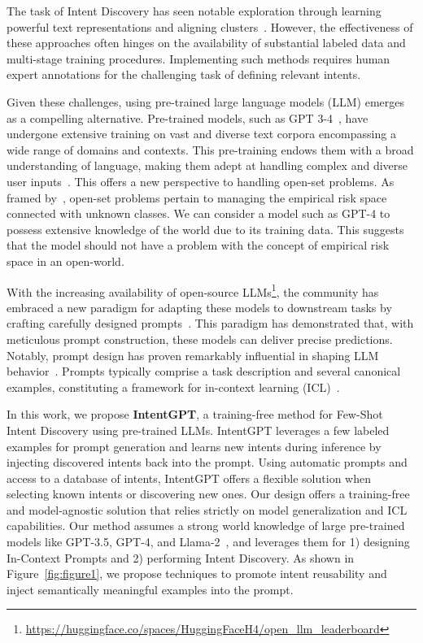 \documentclass[11pt]{article}
\begin{document}
The task of Intent Discovery has seen notable exploration through learning powerful text representations and aligning clusters~\citep{kumar2022intent,zhang2021discovering}. However, the effectiveness of these approaches often hinges on the availability of substantial labeled data and multi-stage training procedures. Implementing such methods requires human expert annotations for the challenging task of defining relevant intents.

Given these challenges, using pre-trained large language models (LLM) emerges as a compelling alternative. Pre-trained models, such as GPT 3-4~\citep{brown2020language, openai2023gpt4}, have undergone extensive training on vast and diverse text corpora encompassing a wide range of domains and contexts. This pre-training endows them with a broad understanding of language, making them adept at handling complex and diverse user inputs~\citep{bubeck2023sparks, rodriguez2023starvector}. This offers a new perspective to handling open-set problems. As framed by~\citet{scheirer2012toward}, open-set problems pertain to managing the empirical risk space connected with unknown classes. We can consider a model such as GPT-4 to possess extensive knowledge of the world due to its training data. This suggests that the model should not have a problem with the concept of empirical risk space in an open-world.

With the increasing availability of open-source LLMs\footnote{\url{https://huggingface.co/spaces/HuggingFaceH4/open_llm_leaderboard}}, the community has embraced a new paradigm for adapting these models to downstream tasks by crafting carefully designed prompts~\citep{liu2023pre}. This paradigm has demonstrated that, with meticulous prompt construction, these models can deliver precise predictions. Notably, prompt design has proven remarkably influential in shaping LLM behavior~\citet{brown2020language}. Prompts typically comprise a task description and several canonical examples, constituting a framework for in-context learning (ICL)~\citep{xie2021explanation}. 

In this work, we propose \textbf{IntentGPT}, a training-free method for Few-Shot Intent Discovery using pre-trained LLMs. IntentGPT leverages a few labeled examples for prompt generation and learns new intents during inference by injecting discovered intents back into the prompt. Using automatic prompts and access to a database of intents, IntentGPT offers a flexible solution when selecting known intents or discovering new ones. Our design offers a training-free and model-agnostic solution that relies strictly on model generalization and ICL capabilities. Our method assumes a strong world knowledge of large pre-trained models like GPT-3.5, GPT-4, and Llama-2~\citep{touvron2023llama2}, and leverages them for 1) designing In-Context Prompts and 2) performing Intent Discovery. As shown in Figure~\ref{fig:figure1}, we propose techniques to promote intent reusability and inject semantically meaningful examples into the prompt. 
\end{document}
